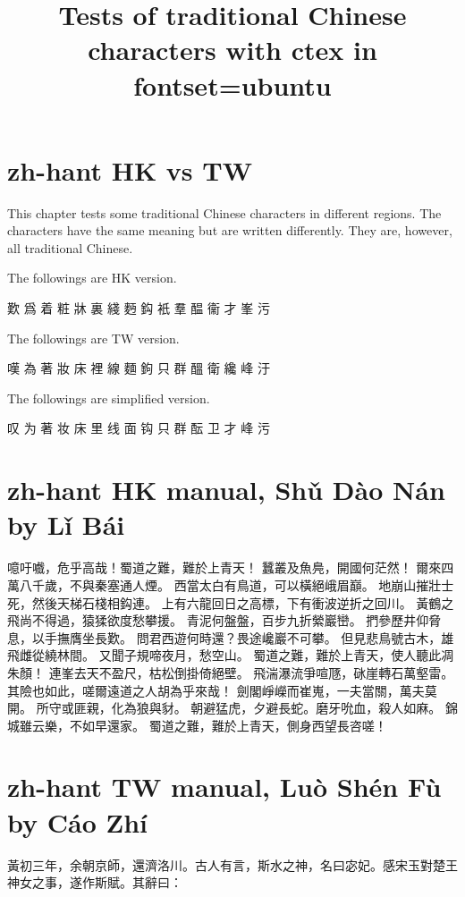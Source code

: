 \documentclass[a4paper,12pt, fontset=none, hyperref]{ctexbook}
\title{Tests of traditional Chinese characters with ctex in fontset=ubuntu}
\begin{document}
\maketitle

	\chapter{zh-hant HK vs TW}
	
		This chapter tests some traditional Chinese characters in different regions. The characters have the same meaning but are written differently. They are, however, all traditional Chinese.
	
		The followings are HK version.
		
		歎 爲 着 粧 牀 裏 綫 麪 鈎 衹 羣 醖 衞 才 峯 污
		
		The followings are TW version.
		  
		嘆 為 著 妝 床 裡 線 麵 鉤 只 群 醞 衛 纔 峰 汙
		
		The followings are simplified version.
		
		叹 为 著 妆 床 里 线 面 钩 只 群 酝 卫 才 峰 污

	\chapter{zh-hant HK manual, Shǔ Dào Nán by Lǐ Bái}
	
		噫吁嚱，危乎高哉！蜀道之難，難於上青天！
		蠶叢及魚鳧，開國何茫然！
		爾來四萬八千歲，不與秦塞通人煙。
		西當太白有鳥道，可以橫絕峨眉巔。
		地崩山摧壯士死，然後天梯石棧相鈎連。
		上有六龍回日之高標，下有衝波逆折之回川。
		黃鶴之飛尚不得過，猿猱欲度愁攀援。
		青泥何盤盤，百步九折縈巖巒。
		捫參歷井仰脅息，以手撫膺坐長歎。
		問君西遊何時還？畏途巉巖不可攀。
		但見悲鳥號古木，雄飛雌從繞林間。
		又聞子規啼夜月，愁空山。
		蜀道之難，難於上青天，使人聽此凋朱顏！
		連峯去天不盈尺，枯松倒掛倚絕壁。
		飛湍瀑流爭喧豗，砯崖轉石萬壑雷。
		其險也如此，嗟爾遠道之人胡為乎來哉！
		劍閣崢嶸而崔嵬，一夫當關，萬夫莫開。
		所守或匪親，化為狼與豺。
		朝避猛虎，夕避長蛇。磨牙吮血，殺人如麻。
		錦城雖云樂，不如早還家。
		蜀道之難，難於上青天，側身西望長咨嗟！
%
	\chapter{zh-hant TW manual, Luò Shén Fù by Cáo Zhí}
	
		黃初三年，余朝京師，還濟洛川。古人有言，斯水之神，名曰宓妃。感宋玉對楚王神女之事，遂作斯賦。其辭曰：
		
\end{document}
